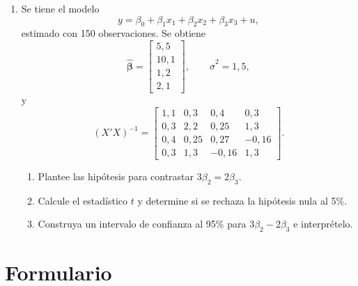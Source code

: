 \documentclass[letterpaper,11pt]{article}
\begin{document}
\begin{enumerate}[resume]
\item Se tiene el modelo
    \[
        y=\beta_0+\beta_1x_1+\beta_2x_2+\beta_3x_3+u,
    \]
    estimado con 150 observaciones. Se obtiene
    \[
        \widehat{\boldsymbol\beta}
        =\begin{bmatrix}5{,}5\\10{,}1\\1{,}2\\2{,}1\end{bmatrix},
        \qquad
        \widehat{\sigma}^{2}=1{,}5,
    \]
    y
    \[
        (X'X)^{-1}=
        \begin{bmatrix}
            1{,}1 & 0{,}3 & 0{,}4 & 0{,}3\\
            0{,}3 & 2{,}2 & 0{,}25 & 1{,}3\\
            0{,}4 & 0{,}25 & 0{,}27 & -0{,}16\\
            0{,}3 & 1{,}3 & -0{,}16 & 1{,}3
        \end{bmatrix}.
    \]
    \begin{enumerate}[label=(\alph*)]
        \item Plantee las hipótesis para contrastar $3\beta_2=2\beta_3$.
        \item Calcule el estadístico $t$ y determine si se rechaza la hipótesis
              nula al 5\%.
        \item Construya un intervalo de confianza al 95\% para
              $3\beta_2-2\beta_3$ e interprételo.
    \end{enumerate}

\end{enumerate}

\newpage
\section{Formulario}
\end{document}

